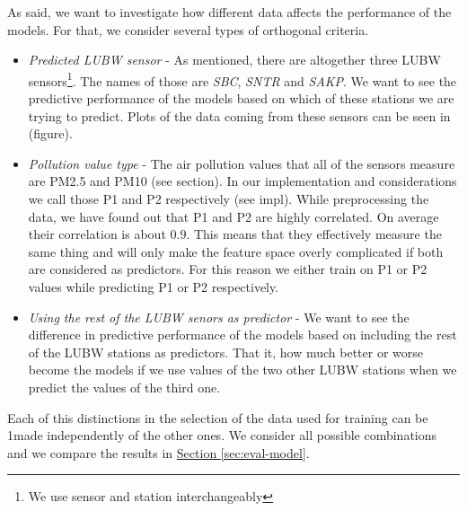 \documentclass[12pt,a4paper,twoside]{scrartcl}
\numberwithin{equation}{section}
\newcommand{\refsec}[1]{\hyperref[#1]{Section \ref*{#1}}}
\begin{document}
As said, we want to investigate how different data affects the performance of the models. For that, we consider several types of orthogonal criteria.
\begin{itemize}
\item \emph{Predicted LUBW sensor} - As mentioned, there are altogether three LUBW sensors\footnote{We use sensor and station interchangeably}. The names of those are \emph{SBC}, \emph{SNTR} and \emph{SAKP}. We want to see the predictive performance of the models based on which of these stations we are trying to predict. Plots of the data coming from these sensors can be seen in (figure).
\item \emph{Pollution value type} - The air pollution values that all of the sensors measure are PM2.5 and PM10 (see section). In our implementation and considerations we call those P1 and P2 respectively (see impl). While preprocessing the data, we have found out that P1 and P2 are highly correlated. On average their correlation is about \(0.9 \). This means that they effectively measure the same thing and will only make the feature space overly complicated if both are considered as predictors. For this reason we either train on P1 or P2 values while predicting P1 or P2 respectively.
\item \emph{Using the rest of the LUBW senors as predictor} -  We want to see the difference in predictive performance of the models based on including the rest of the LUBW stations as predictors. That it, how much better or worse become the models if we use values of the two other LUBW stations when we predict the values of the third one.
\end{itemize}
Each of this distinctions in the selection of the data used for training can be 1made independently of the other ones. We consider all possible combinations and we compare the results in \refsec{sec:eval-model}.
\\
\end{document}
